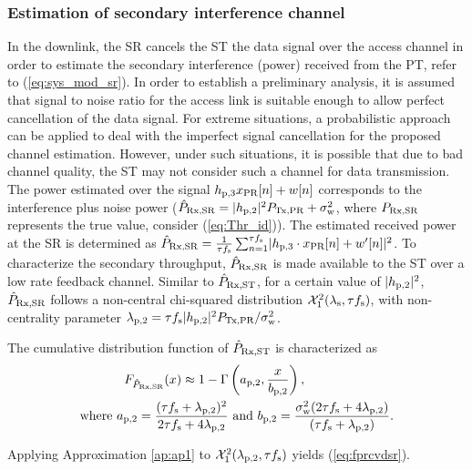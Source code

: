 \subsubsection{Estimation of secondary interference channel}
In the downlink, the SR cancels the ST the data signal over the access channel in order to estimate the secondary interference (power) received from the PT, refer to (\ref{eq:sys_mod_sr}). In order to establish a preliminary analysis, it is assumed that signal to noise ratio for the access link is suitable enough to allow perfect cancellation of the data signal. For extreme situations, a probabilistic approach can be applied to deal with the imperfect signal cancellation for the proposed channel estimation. However, under such situations, it is possible that due to bad channel quality, the ST may not consider such a channel for data transmission. The power estimated over the signal $h_{\text{p,3}} x_{\text{PR}}[n] + w[n]$ corresponds to the interference plus noise power ($\hat{P}_{\text{Rx,SR}} = |h_{\text{p,2}}|^2 P_{\text{Tx,PR}} + \sigma^2_{\text{w}}$, where $P_{\text{Rx,SR}}$ represents the true value, consider (\ref{eq:Thr_id})). The estimated received power at the SR is determined as $\hat{P}_{\text{Rx,SR}} = {\frac{1}{{\tau f_{\text{s}}}}\sum_{n=1}^{\tau f_{\text{s}}}} {|h_{\text{p,3}} \cdot x_{\text{PR}}[n] + w'[n]|^2}$. To characterize the secondary throughput, $\hat{P}_{\text{Rx,SR}}$ is made available to the ST over a low rate feedback channel. Similar to $\hat{P}_{\text{Rx,ST}}$, for a certain value of $|h_{\text{p,2}}|^2$, $\hat{P}_{\text{Rx,SR}}$ follows a non-central chi-squared distribution $\ncchi2(\ls, \tau \fsam)$, with non-centrality parameter $\lambda_{\text{p,2}} = \tau f_{\text{s}} |h_{\text{p,2}}|^2 P_{\text{Tx,PR}} / \sigma^2_{\text{w}}$.
\begin{lemma} \label{lm:lm3}
\normalfont
The cumulative distribution function of $\hat{P}_{\text{Rx,ST}}$ is characterized as 
\begin{align}
F_{\hat{P}_{\text{Rx,SR}}}(x) \approx 1 - \Gamma&\left(a_{\text{p,2}}, \frac{x}{b_{\text{p,2}}}\right) \label{eq:fprcvdsr}, \\ 
\text{where  } a_{\text{p,2}} = \frac{(\tau f_{\text{s}} + \lambda_{\text{p,2}})^2}{2 \tau f_{\text{s}} + 4 \lambda_{\text{p,2}}} &\text{ and } b_{\text{p,2}} = \frac{\sigma^2_{\text{w}} (2 \tau f_{\text{s}} + 4 \lambda_{\text{p,2}})}{(\tau f_{\text{s}} + \lambda_{\text{p,2}})}.  \label{eq:para_pt} 
\end{align} 
\end{lemma}
\begin{IEEEproof}
Applying Approximation \ref{ap:ap1} to $\ncchi2(\lpt, \tau \fsam)$ yields (\ref{eq:fprcvdsr}). 
\end{IEEEproof}
